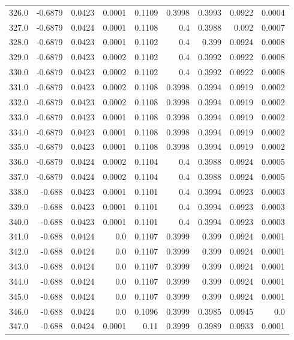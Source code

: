 \begin{longtable}{lrrrrrrrr}
326.0 & -0.6879 & 0.0423 & 0.0001 & 0.1109 & 0.3998 & 0.3993 & 0.0922 & 0.0004 \\
327.0 & -0.6879 & 0.0424 & 0.0001 & 0.1108 & 0.4 & 0.3988 & 0.092 & 0.0007 \\
328.0 & -0.6879 & 0.0423 & 0.0001 & 0.1102 & 0.4 & 0.399 & 0.0924 & 0.0008 \\
329.0 & -0.6879 & 0.0423 & 0.0002 & 0.1102 & 0.4 & 0.3992 & 0.0922 & 0.0008 \\
330.0 & -0.6879 & 0.0423 & 0.0002 & 0.1102 & 0.4 & 0.3992 & 0.0922 & 0.0008 \\
331.0 & -0.6879 & 0.0423 & 0.0002 & 0.1108 & 0.3998 & 0.3994 & 0.0919 & 0.0002 \\
332.0 & -0.6879 & 0.0423 & 0.0002 & 0.1108 & 0.3998 & 0.3994 & 0.0919 & 0.0002 \\
333.0 & -0.6879 & 0.0423 & 0.0001 & 0.1108 & 0.3998 & 0.3994 & 0.0919 & 0.0002 \\
334.0 & -0.6879 & 0.0423 & 0.0001 & 0.1108 & 0.3998 & 0.3994 & 0.0919 & 0.0002 \\
335.0 & -0.6879 & 0.0423 & 0.0001 & 0.1108 & 0.3998 & 0.3994 & 0.0919 & 0.0002 \\
336.0 & -0.6879 & 0.0424 & 0.0002 & 0.1104 & 0.4 & 0.3988 & 0.0924 & 0.0005 \\
337.0 & -0.6879 & 0.0424 & 0.0002 & 0.1104 & 0.4 & 0.3988 & 0.0924 & 0.0005 \\
338.0 & -0.688 & 0.0423 & 0.0001 & 0.1101 & 0.4 & 0.3994 & 0.0923 & 0.0003 \\
339.0 & -0.688 & 0.0423 & 0.0001 & 0.1101 & 0.4 & 0.3994 & 0.0923 & 0.0003 \\
340.0 & -0.688 & 0.0423 & 0.0001 & 0.1101 & 0.4 & 0.3994 & 0.0923 & 0.0003 \\
341.0 & -0.688 & 0.0424 & 0.0 & 0.1107 & 0.3999 & 0.399 & 0.0924 & 0.0001 \\
342.0 & -0.688 & 0.0424 & 0.0 & 0.1107 & 0.3999 & 0.399 & 0.0924 & 0.0001 \\
343.0 & -0.688 & 0.0424 & 0.0 & 0.1107 & 0.3999 & 0.399 & 0.0924 & 0.0001 \\
344.0 & -0.688 & 0.0424 & 0.0 & 0.1107 & 0.3999 & 0.399 & 0.0924 & 0.0001 \\
345.0 & -0.688 & 0.0424 & 0.0 & 0.1107 & 0.3999 & 0.399 & 0.0924 & 0.0001 \\
346.0 & -0.688 & 0.0424 & 0.0 & 0.1096 & 0.3999 & 0.3985 & 0.0945 & 0.0 \\
347.0 & -0.688 & 0.0424 & 0.0001 & 0.11 & 0.3999 & 0.3989 & 0.0933 & 0.0001 \\

\end{longtable}
